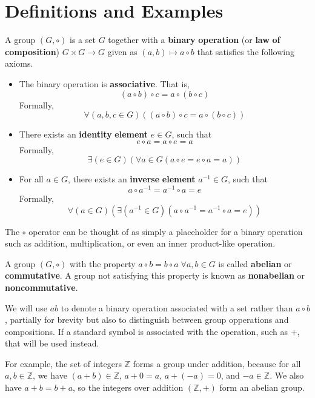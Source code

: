 \documentclass[12pt, letterpaper]{report}
\begin{document}
\section{Definitions and Examples}
\begin{definition}[Group]\label{group}
	A group \((G,\circ )\)  is a set \(G\) together with a \textbf{binary} \textbf{operation} (or \textbf{law} \textbf{of} \textbf{composition}) \(G\times G\to G\) given as \((a,b)\mapsto a\circ b\) that satisfies the following axioms. 
	\begin{itemize}
		\item The binary operation is \textbf{associative}. That is, 
		\[
			(a\circ b)\circ c=a\circ (b\circ c)
		\]
		Formally,
		\[
			\forall (a,b,c\in G)((a\circ b)\circ c=a\circ (b\circ c))
		\]
		\item There exists an \textbf{identity} \textbf{element} \(e\in G\), such that
		\[
			e\circ a=a\circ e=a
		\]
		Formally,
		\[
			\exists (e\in G)(\forall a\in G(a\circ e=e\circ a=a))
		\]
		\item For all \( a\in G\), there exists an \textbf{inverse} \textbf{element} \(a^{-1} \in G\), such that 
		\[
			a\circ a^{-1} =a^{-1} \circ a=e
		\]
		Formally,
		\[
			\forall (a\in G)(\exists (a^{-1} \in G)(a\circ a^{-1} =a^{-1} \circ a=e))
		\]
	\end{itemize}
	The \(\circ \) operator can be thought of as simply a placeholder for a binary operation such as addition, multiplication, or even an inner product-like operation.
\end{definition}
\begin{definition}\label{abelian}
	A group \((G,\circ )\) with the property \(a\circ b=b\circ a\;\forall a,b\in G\) is called \textbf{abelian} or \textbf{commutative}. A group not satisfying this property is known as \textbf{nonabelian} or \textbf{noncommutative}.
\end{definition}
\begin{notation}
	We will use \(ab\) to denote a binary operation associated with a set rather than \(a\circ b\), partially for brevity but also to distinguish between group opperations and compositions. If a standard symbol is associated with the operation, such as \(+\), that will be used instead.
\end{notation}
For example, the set of integers \(\mathbb{Z} \) forms a group under addition, because for all \(a,b\in\mathbb{Z} \), we have \((a+b)\in\mathbb{Z} \), \(a+0=a\), \(a+(-a)=0\), and \(-a\in\mathbb{Z} \). We also have \(a+b=b+a\), so the integers over addition \((\mathbb{Z} ,+)\) form an abelian group.\\
\end{document}
